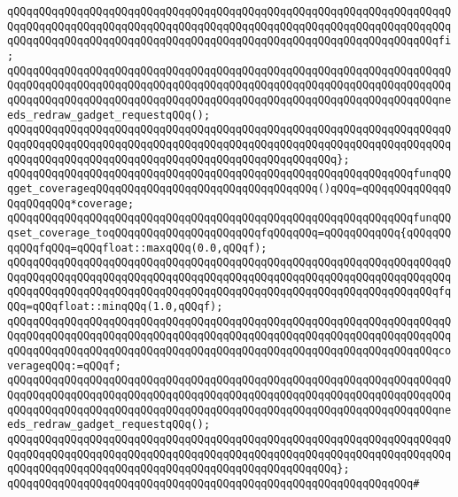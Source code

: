 \verb|qQQqqQQqqQQqqQQqqQQqqQQqqQQqqQQqqQQqqQQqqQQqqQQqqQQqqQQqqQQqqQQqqQQqqQQqqQQqqQQqqQQqqQQqqQQqqQQqqQQqqQQqqQQqqQQqqQQqqQQqqQQqqQQqqQQqqQQqqQQqqQQqqQQqqQQqqQQqqQQqqQQqqQQqqQQqqQQqqQQqqQQqqQQqqQQqqQQqqQQqqQQqqQQqfi;|\newline
\verb|qQQqqQQqqQQqqQQqqQQqqQQqqQQqqQQqqQQqqQQqqQQqqQQqqQQqqQQqqQQqqQQqqQQqqQQqqQQqqQQqqQQqqQQqqQQqqQQqqQQqqQQqqQQqqQQqqQQqqQQqqQQqqQQqqQQqqQQqqQQqqQQqqQQqqQQqqQQqqQQqqQQqqQQqqQQqqQQqqQQqqQQqqQQqqQQqqQQqqQQqqQQqqQQqneeds_redraw_gadget_requestqQQq();|\newline
\verb|qQQqqQQqqQQqqQQqqQQqqQQqqQQqqQQqqQQqqQQqqQQqqQQqqQQqqQQqqQQqqQQqqQQqqQQqqQQqqQQqqQQqqQQqqQQqqQQqqQQqqQQqqQQqqQQqqQQqqQQqqQQqqQQqqQQqqQQqqQQqqQQqqQQqqQQqqQQqqQQqqQQqqQQqqQQqqQQqqQQqqQQqqQQqqQQq};|\newline
\newline
\verb|qQQqqQQqqQQqqQQqqQQqqQQqqQQqqQQqqQQqqQQqqQQqqQQqqQQqqQQqqQQqqQQqfunqQQqget_coverageqQQqqQQqqQQqqQQqqQQqqQQqqQQqqQQqqQQq()qQQq=qQQqqQQqqQQqqQQqqQQqqQQq*coverage;|\newline
\verb|qQQqqQQqqQQqqQQqqQQqqQQqqQQqqQQqqQQqqQQqqQQqqQQqqQQqqQQqqQQqqQQqfunqQQqset_coverage_toqQQqqQQqqQQqqQQqqQQqqQQqfqQQqqQQq=qQQqqQQqqQQq{qQQqqQQqqQQqfqQQq=qQQqfloat::maxqQQq(0.0,qQQqf);|\newline
\verb|qQQqqQQqqQQqqQQqqQQqqQQqqQQqqQQqqQQqqQQqqQQqqQQqqQQqqQQqqQQqqQQqqQQqqQQqqQQqqQQqqQQqqQQqqQQqqQQqqQQqqQQqqQQqqQQqqQQqqQQqqQQqqQQqqQQqqQQqqQQqqQQqqQQqqQQqqQQqqQQqqQQqqQQqqQQqqQQqqQQqqQQqqQQqqQQqqQQqqQQqqQQqqQQqfqQQq=qQQqfloat::minqQQq(1.0,qQQqf);|\newline
\verb|qQQqqQQqqQQqqQQqqQQqqQQqqQQqqQQqqQQqqQQqqQQqqQQqqQQqqQQqqQQqqQQqqQQqqQQqqQQqqQQqqQQqqQQqqQQqqQQqqQQqqQQqqQQqqQQqqQQqqQQqqQQqqQQqqQQqqQQqqQQqqQQqqQQqqQQqqQQqqQQqqQQqqQQqqQQqqQQqqQQqqQQqqQQqqQQqqQQqqQQqqQQqqQQqcoverageqQQq:=qQQqf;|\newline
\verb|qQQqqQQqqQQqqQQqqQQqqQQqqQQqqQQqqQQqqQQqqQQqqQQqqQQqqQQqqQQqqQQqqQQqqQQqqQQqqQQqqQQqqQQqqQQqqQQqqQQqqQQqqQQqqQQqqQQqqQQqqQQqqQQqqQQqqQQqqQQqqQQqqQQqqQQqqQQqqQQqqQQqqQQqqQQqqQQqqQQqqQQqqQQqqQQqqQQqqQQqqQQqqQQqneeds_redraw_gadget_requestqQQq();|\newline
\verb|qQQqqQQqqQQqqQQqqQQqqQQqqQQqqQQqqQQqqQQqqQQqqQQqqQQqqQQqqQQqqQQqqQQqqQQqqQQqqQQqqQQqqQQqqQQqqQQqqQQqqQQqqQQqqQQqqQQqqQQqqQQqqQQqqQQqqQQqqQQqqQQqqQQqqQQqqQQqqQQqqQQqqQQqqQQqqQQqqQQqqQQqqQQqqQQq};|\newline
\newline
\verb|qQQqqQQqqQQqqQQqqQQqqQQqqQQqqQQqqQQqqQQqqQQqqQQqqQQqqQQqqQQqqQQq#|\newline
